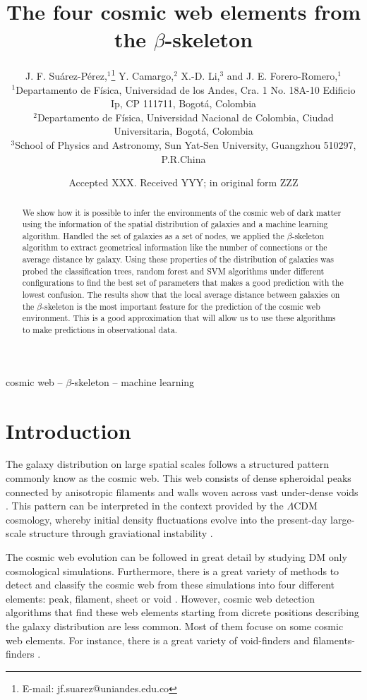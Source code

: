 \documentclass[usenatbib]{mnras}
\title[Cosmic web elements and the $\beta$-skeleton]{The four cosmic web
  elements from the $\beta$-skeleton}
\author[J. F. Su\'arez-P\'erez et al.]{
J. F. Su\'arez-P\'erez,$^{1}$\thanks{E-mail: jf.suarez@uniandes.edu.co}
Y. Camargo,$^{2}$ 
X.-D. Li,$^{3}$
and J. E. Forero-Romero,$^{1}$
\\
$^{1}$Departamento de F\'isica, Universidad de los Andes, Cra. 1 No. 18A-10 Edificio Ip, CP 111711, Bogot\'a, Colombia\\
$^{2}$Departamento de F\'isica, Universidad Nacional de Colombia, Ciudad Universitaria, Bogot\'a, Colombia\\
$^{3}$School of Physics and Astronomy, Sun Yat-Sen University, Guangzhou 510297, P.R.China\\
}
\date{Accepted XXX. Received YYY; in original form ZZZ}
\begin{document}
\label{firstpage}
\pagerange{\pageref{firstpage}--\pageref{lastpage}}
\maketitle

\begin{abstract}
We show how it is possible to infer the environments of the cosmic web
of dark matter using the information of the spatial distribution of
galaxies and a machine learning algorithm. 
Handled the set of galaxies as a set of nodes, we applied the
$\beta$-skeleton algorithm to extract geometrical information like the
number of connections or the average distance by galaxy. 
Using these properties of the distribution of galaxies was probed the
classification trees, random forest and SVM algorithms under different
configurations to find the best set of parameters that makes a good
prediction with the lowest confusion.  
The results show that the local average distance between galaxies on
the $\beta$-skeleton is the most important feature for the prediction
of the cosmic web environment. 
This is a good approximation that will allow us to use these
algorithms to make predictions in observational data.  
\end{abstract}

\begin{keywords}
cosmic web -- $\beta$-skeleton -- machine learning
\end{keywords}


\section{Introduction}
The galaxy distribution on large spatial scales follows a structured 
pattern commonly know as the cosmic web. 
This web consists of dense spheroidal peaks connected by
anisotropic filaments and walls woven across vast under-dense voids
\citep{Bond1996}. 
This pattern can be interpreted in the context provided by the
$\Lambda$CDM cosmology, whereby initial density fluctuations   evolve
into the present-day large-scale structure through graviational
instability \citep{ZelDovich1970,White1987}.  

The cosmic web evolution can be followed in great detail by studying
DM only cosmological simulations. 
Furthermore, there is a great variety of methods to detect and
classify the cosmic web from these simulations into four different
elements: peak, filament, sheet or void \citep{Libeskind2018}.  
However, cosmic web detection algorithms that find these web elements
starting from dicrete positions describing the galaxy distribution are
less common.
Most of them focuse on some cosmic web elements.
For instance, there is a great variety of void-finders
\citep{Platen2007,Neyrinck2008,Ravoux2020} and filaments-finders
\citep{Novikov2003,Zhang2009,Sousbie2010,Chen2015,Luber2019,Malavasi2020}.   
\end{document}
